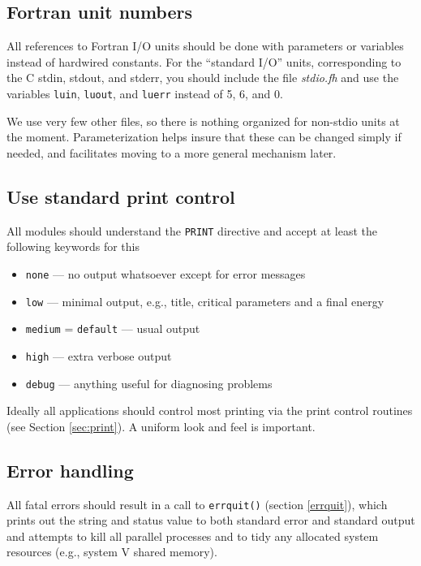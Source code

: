 \subsection{Fortran unit numbers}

All references to Fortran I/O units should be done with parameters or
variables instead of hardwired constants.  For the ``standard I/O''
units, corresponding to the C stdin, stdout, and stderr, you should
include the file {\em stdio.fh} and use the variables \verb+luin+,
\verb+luout+, and \verb+luerr+ instead of 5, 6, and 0.

We use very few other files, so there is nothing organized for
non-stdio units at the moment.  Parameterization helps insure that
these can be changed simply if needed, and facilitates moving to a
more general mechanism later.

\subsection{Use standard print control}

All modules should understand the \verb+PRINT+ directive and
accept at least the following keywords for this
\begin{itemize}
\item \verb+none+ --- no output whatsoever except for error messages
\item \verb+low+ --- minimal output, e.g., title, critical parameters
and a final energy
\item \verb+medium+ = \verb+default+ --- usual output
\item \verb+high+ --- extra verbose output
\item \verb+debug+ --- anything useful for diagnosing problems
\end{itemize}

Ideally all applications should control most printing via the print
control routines (see Section \ref{sec:print}).  A uniform
look and feel is important.

\subsection{Error handling}

All fatal errors should result in a call to \verb+errquit()+ (section
\ref{errquit}), which prints out the string and status value to both
standard error and standard output and attempts to kill all parallel
processes and to tidy any allocated system resources (e.g., system V
shared memory).

